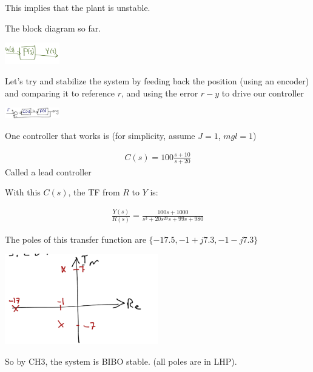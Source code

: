 \begin{enumerate}
\begin{itemize}
                    This implies that the plant is unstable.

                    The block diagram so far.

                    \includegraphics[width=90px,keepaspectratio]{images/5-2-b.png}

                    Let's try and stabilize the system by feeding back the position (using an encoder) and comparing it to reference $r$, and using the error $r-y$ to drive our controller

                    \includegraphics[width=90px,keepaspectratio]{images/5-2-c.png}

                    One controller that works is (for simplicity, assume $J = 1$, $mgl = 1$)

                    \begin{align*}
                        C(s) = 100  \frac{s+10}{s+20}
                    \end{align*}
                    Called a lead controller

                    With this $C(s)$, the TF from $R$ to $Y$ is:

                    \begin{align*}
                        \frac{Y(s)}{R(s)} =
                        \frac{100s + 1000}{s^3 + 20s^20s + 99s + 980}
                    \end{align*}

                    The poles of this transfer function are $\{ -17.5, -1+j7.3, -1 - j7.3\}$

                    \begin{center}\includegraphics[width=0.5\textwidth,keepaspectratio]{images/5-2-d.png}\end{center}

                    So by CH3, the system is BIBO stable. (all poles are in LHP).


\end{itemize}
\end{enumerate}
